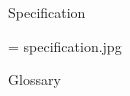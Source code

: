 \app Specification

\picw=\hsize %
\cinspic specification.jpg
\nextoddpage

\app Glossary
\par
\makeglos
